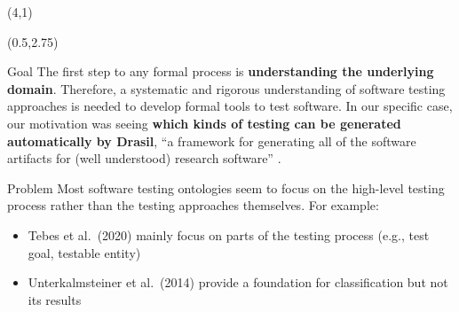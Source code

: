 \documentclass[22pt]{beamer}
\begin{document}
\begin{frame}[fragile]
    \begin{textblock}{8}(4,1)
        \titlepage
    \end{textblock}

    \begin{textblock}{7.25}(0.5,2.75)

        \begin{block}{\fontsize{37}{20}\selectfont Goal}
            The first step to any formal process is \textbf{understanding the
                underlying domain}. Therefore, a systematic and rigorous
            understanding of software testing approaches is needed to develop formal
            tools to test software. In our specific case, our motivation was seeing
            \textbf{which kinds of testing can be generated automatically by Drasil},
            ``a framework for generating all of the software artifacts for
            (well understood) research software'' \cite{carette_drasil_2021}.
            \vspace{7mm}
        \end{block}

        \begin{block}{\fontsize{37}{20}\selectfont Problem}
            Most software testing ontologies seem to focus on the high-level
            testing process rather than the testing approaches themselves. For
            example:
            \begin{itemize}
                \item Tebes et al.~(2020) mainly focus on parts of the
                      testing process (e.g., test goal, testable entity)
                \item Unterkalmsteiner et al.~(2014) provide a foundation for
                      classification but not its results
            \end{itemize}
            \vspace{5mm}
        \end{block}


\end{textblock}
\end{frame}
\end{document}
